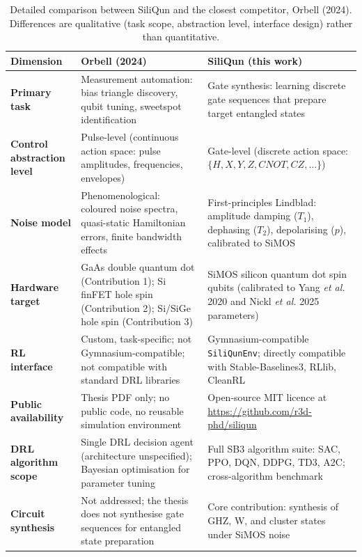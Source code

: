 \begin{table}[ht]
\centering
\caption{Detailed comparison between SiliQun and the closest competitor,
Orbell (2024). Differences are qualitative (task scope, abstraction level,
interface design) rather than quantitative.}
\label{tab:oxford_comparison_rw}
\small
\begin{tabular}{p{3.8cm}p{5.2cm}p{5.2cm}}
\toprule
\textbf{Dimension} & \textbf{Orbell (2024)} & \textbf{SiliQun (this work)} \\
\midrule
\textbf{Primary task} &
  Measurement automation: bias triangle discovery, qubit tuning, sweetspot identification &
  Gate synthesis: learning discrete gate sequences that prepare target entangled states \\
\addlinespace
\textbf{Control abstraction level} &
  Pulse-level (continuous action space: pulse amplitudes, frequencies, envelopes) &
  Gate-level (discrete action space: $\{H, X, Y, Z, CNOT, CZ, \ldots\}$) \\
\addlinespace
\textbf{Noise model} &
  Phenomenological: coloured noise spectra, quasi-static Hamiltonian errors, finite bandwidth effects &
  First-principles Lindblad: amplitude damping ($T_1$), dephasing ($T_2$), depolarising ($p$), calibrated to SiMOS \\
\addlinespace
\textbf{Hardware target} &
  GaAs double quantum dot (Contribution 1); Si finFET hole spin (Contribution 2); Si/SiGe hole spin (Contribution 3) &
  SiMOS silicon quantum dot spin qubits (calibrated to Yang \emph{et al.} 2020 and Nickl \emph{et al.} 2025 parameters) \\
\addlinespace
\textbf{RL interface} &
  Custom, task-specific; not Gymnasium-compatible; not compatible with standard DRL libraries &
  Gymnasium-compatible \texttt{SiliQunEnv}; directly compatible with Stable-Baselines3, RLlib, CleanRL \\
\addlinespace
\textbf{Public availability} &
  Thesis PDF only; no public code, no reusable simulation environment &
  Open-source MIT licence at \url{https://github.com/r3d-phd/siliqun} \\
\addlinespace
\textbf{DRL algorithm scope} &
  Single DRL decision agent (architecture unspecified); Bayesian optimisation for parameter tuning &
  Full SB3 algorithm suite: SAC, PPO, DQN, DDPG, TD3, A2C; cross-algorithm benchmark \\
\addlinespace
\textbf{Circuit synthesis} &
  Not addressed; the thesis does not synthesise gate sequences for entangled state preparation &
  Core contribution: synthesis of GHZ, W, and cluster states under SiMOS noise \\

\end{tabular}
\end{table}
